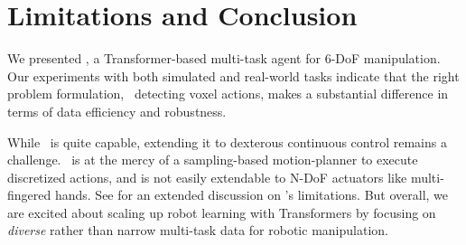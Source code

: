 \vspace{-0.1cm}
\section{Limitations and Conclusion}
\vspace{-0.1cm}
We presented \model, a Transformer-based multi-task agent for 6-DoF manipulation. Our experiments with both simulated and real-world tasks indicate that the right problem formulation, \ie~detecting voxel actions, makes a substantial difference in terms of data efficiency and robustness. 

While \model~is quite capable, extending it to dexterous continuous control remains a challenge. \model~is at the mercy of a sampling-based motion-planner to execute discretized actions, and is not easily extendable to N-DoF actuators like multi-fingered hands. See  for an extended discussion on \model's limitations.
But overall, we are excited about scaling up robot learning with Transformers by focusing on \textit{diverse} rather than narrow multi-task data for robotic manipulation. 


\newpage

